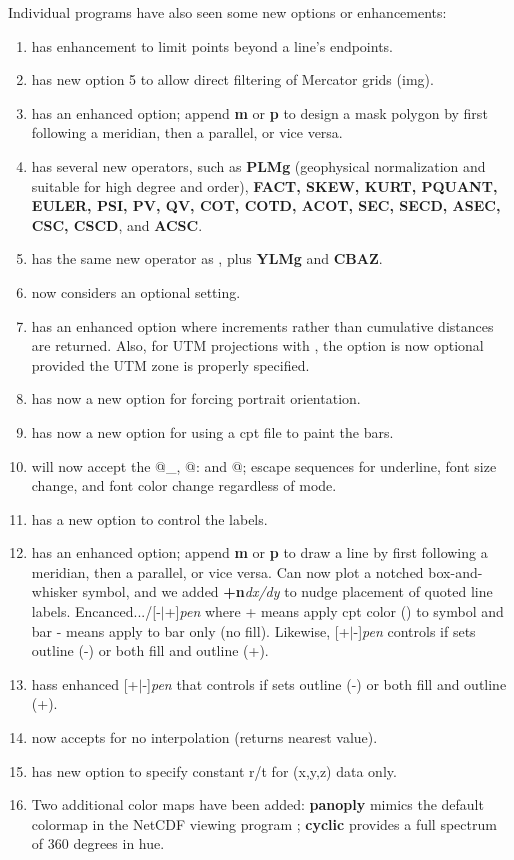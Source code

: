 Individual programs have also seen some new options or enhancements:
\begin{enumerate}
\item {} has enhancement  to limit points beyond a line's endpoints.
\item {} has new option 5 to allow direct filtering of Mercator grids (img).
\item {} has an enhanced  option; append {\bf m} or {\bf p} to design
a mask polygon by first following a meridian, then a parallel, or vice versa.
\item {} has several new operators, such as {\bf PLMg} (geophysical normalization
and suitable for high degree and order), {\bf FACT, SKEW, KURT, PQUANT, EULER, PSI, PV, QV, COT,
COTD, ACOT, SEC, SECD, ASEC, CSC, CSCD}, and {\bf ACSC}.
\item {} has the same new operator as , plus {\bf YLMg} and {\bf CBAZ}.
\item {} now considers  an optional setting.
\item {} has an enhanced  option where increments rather than 
cumulative distances are returned.  Also, for UTM projections with , the 
option is now optional provided the UTM zone is properly specified.
\item {} has now a new  option for forcing portrait orientation.
\item {} has now a new  option for using a cpt file to paint the bars.
\item {} will now accept the @\_, @: and @; escape sequences for underline,
font size change, and font color change regardless of mode.
\item {} has a new option  to control the labels.
\item {} has an enhanced  option; append {\bf m} or {\bf p} to draw a
line by first following a meridian, then a parallel, or vice versa. Can now plot a notched
box-and-whisker symbol, and we added {\bf +n}{\it dx/dy} to nudge placement of quoted line labels.
Encanced.../[-$|$+]{\it pen} where + means apply cpt color () to symbol and bar
- means apply to bar only (no fill).  Likewise, [+$|$-]{\it pen} controls
if  sets outline (-) or both fill and outline (+).
\item {} hass enhanced [+$|$-]{\it pen} that controls if  sets outline (-)
or both fill and outline (+).
\item {} now accepts  for no interpolation (returns nearest value).
\item {} has new option  to specify constant r/t for (x,y,z) data only.
\item Two additional color maps have been added: \textbf{panoply} mimics the default colormap in
the NetCDF viewing program ; \textbf{cyclic} provides a full spectrum of 360 degrees
in hue.
\end{enumerate}

